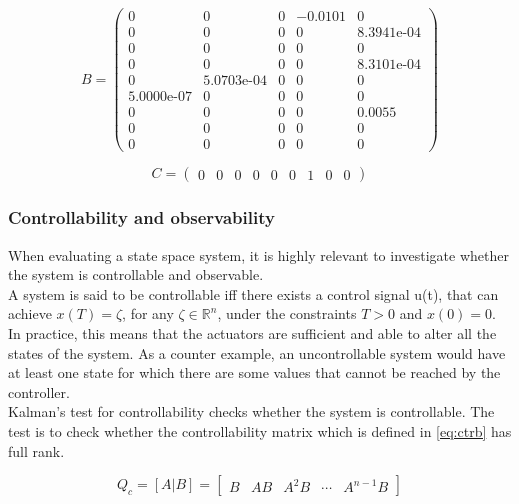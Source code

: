 \begin{equation}  \label{eq:B}
	B = \left(\begin{array}{ccccc}
		0 & 0 & 0 & -0.0101 & 0\\
		0 & 0 & 0 & 0 & \text{8.3941e-04}\\
		0 & 0 & 0 & 0 & 0\\
		0 & 0 & 0 & 0 & \text{8.3101e-04}\\
		0 & \text{5.0703e-04} & 0 & 0 & 0\\
		\text{5.0000e-07} & 0 & 0 & 0 & 0\\
		0 & 0 & 0 & 0 & 0.0055\\
		0 & 0 & 0 & 0 & 0\\
		0 & 0 & 0 & 0 & 0
	\end{array}\right)
\end{equation}

\begin{equation}  \label{eq:C}
	C =\left(\begin{array}{ccccccccc}
		0 & 0 & 0 & 0 & 0 & 0 & 1 & 0 & 0
	\end{array}\right)
\end{equation}





\subsubsection{Controllability and observability}
When evaluating a state space system, it is highly relevant to investigate whether the system is controllable and observable. \\
A system is said to be controllable iff there exists a control signal u(t), that can achieve $x(T) = \zeta$, for any $\zeta \in \mathbb{R} ^{n}$, under the constraints $T>0$ and $x(0)=0$. In practice, this means that the actuators are sufficient and able to alter all the states of the system. As a counter example, an uncontrollable system would have at least one state for which there are some values that cannot be reached by the controller.\\
Kalman's test for controllability checks whether the system is controllable. The test is to check whether the controllability matrix which is defined in \cref{eq:ctrb} has full rank.

\begin{equation} \label{eq:ctrb}
	Q_c = [A|B] = \begin{bmatrix}  B & AB & A^2B & \cdots & A^{n-1}B  \end{bmatrix}
\end{equation}

